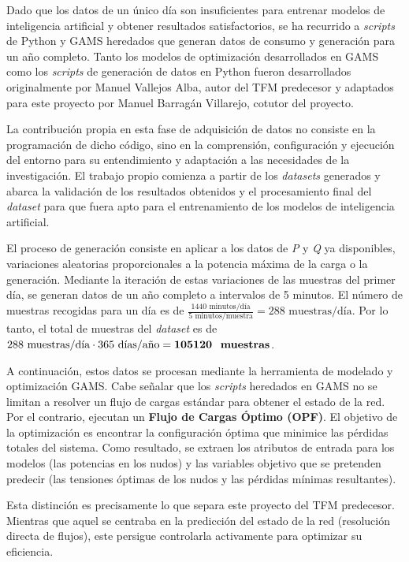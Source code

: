 Dado que los datos de un único día son insuficientes para entrenar modelos de inteligencia artificial y obtener resultados satisfactorios, se ha recurrido a  \textit{scripts} de Python y GAMS heredados que generan datos de consumo y generación para un año completo. Tanto los modelos de optimización desarrollados en GAMS como los \textit{scripts} de generación de datos en Python fueron desarrollados originalmente por Manuel Vallejos Alba, autor del TFM predecesor y adaptados para este proyecto por Manuel Barragán Villarejo, cotutor del proyecto.

La contribución propia en esta fase de adquisición de datos no consiste en la programación de dicho código, sino en la comprensión, configuración y ejecución del entorno para su entendimiento y adaptación a las necesidades de la investigación. El trabajo propio comienza a partir de los \textit{datasets} generados y abarca la validación de los resultados obtenidos y el procesamiento final del \textit{dataset} para que fuera apto para el entrenamiento de los modelos de inteligencia artificial.

El proceso de generación consiste en aplicar a los datos de \textit{P} y \textit{Q} ya disponibles, variaciones aleatorias proporcionales a la potencia máxima de la carga o la generación. Mediante la iteración de estas variaciones de las muestras del primer día, se generan datos de un año completo a intervalos de 5 minutos. El número de muestras recogidas para un día es de $\frac{1440 \text{ minutos/día}}{5 \text{ minutos/muestra}} = 288 \text{ muestras/día}$. Por lo tanto, el total de muestras del \textit{dataset} es de $288 \text{ muestras/día} \cdot 365 \text{ días/año} = \textbf{105120 \text{ muestras}}$.

A continuación, estos datos se procesan mediante la herramienta de modelado y optimización GAMS. Cabe señalar que los \textit{scripts} heredados en GAMS no se limitan a resolver un flujo de cargas estándar para obtener el estado de la red. Por el contrario, ejecutan un \textbf{Flujo de Cargas Óptimo (OPF)}. El objetivo de la optimización es encontrar la configuración óptima que minimice las pérdidas totales del sistema. Como resultado, se extraen los atributos de entrada para los modelos (las potencias en los nudos) y las variables objetivo que se pretenden predecir (las tensiones óptimas de los nudos y las pérdidas mínimas resultantes).

Esta distinción es precisamente lo que separa este proyecto del TFM predecesor. Mientras que aquel se centraba en la predicción del estado de la red (resolución directa de flujos), este persigue controlarla activamente para optimizar su eficiencia. 

